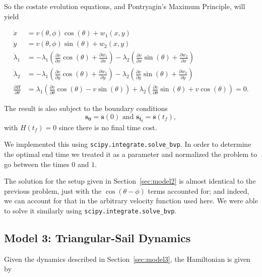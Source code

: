 \documentclass[11pt]{amsart}
\begin{document}
So the costate evolution equations, and Pontryagin's Maximum Principle, will yield

\begin{align*}
    \dot{x} &= v(\theta, \phi) \cos(\theta) + w_1(x, y) \\
    \dot{y} &= v(\theta, \phi) \sin(\theta) + w_2(x, y) \\
    \dot{\lambda}_1 &= -\lambda_1 \left ( \frac{\partial v}{\partial x} \cos(\theta) + \frac{\partial w_1}{\partial x} \right ) - \lambda_2 \left ( \frac{\partial v}{\partial x} \sin(\theta) + \frac{\partial w_2}{\partial x} \right )\\
    \dot{\lambda}_2 &= -\lambda_1 \left ( \frac{\partial v}{\partial y} \cos(\theta) + \frac{\partial w_1}{\partial y} \right ) - \lambda_2 \left ( \frac{\partial v}{\partial y} \sin(\theta) + \frac{\partial w_2}{\partial y} \right )\\
    \frac{\partial H}{\partial \theta} &= \lambda_1 \left (\frac{\partial v}{\partial \theta} \cos(\theta) - v \sin(\theta) \right ) + \lambda_2 \left (\frac{\partial v}{\partial \theta} \sin(\theta) + v \cos(\theta) \right ) = 0.
\end{align*}

\par The result is also subject to the boundary conditions
$$\mathbf{s_{0}} = \mathbf{s}(0) \text{ and } \mathbf{s_{t_f}} = \mathbf{s}(t_f),$$
with $H(t_f) = 0$ since there is no final time cost.

\par We implemented this using \verb|scipy.integrate.solve_bvp|. In order to determine the optimal end time we treated it as a parameter and normalized the problem to go between the times $0$ and $1.$

\par The solution for the setup given in Section~\ref{sec:model2} is almost identical to the previous problem, just with the $\cos(\theta - \phi)$ terms accounted for; and indeed, we can account for that in the arbitrary velocity function used here. We were able to solve it similarly using \verb|scipy.integrate.solve_bvp|.

\subsection{Model 3: Triangular-Sail Dynamics}

\par Given the dynamics described in Section~\ref{sec:model3}, the Hamiltonian is given by 
\end{document}
